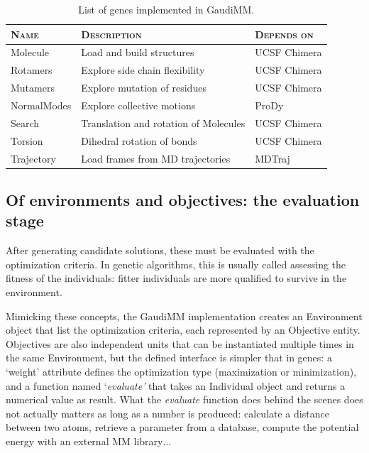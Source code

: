 \begin{table}[hbtp]
	\caption[List of genes implemented in GaudiMM]{List of genes implemented in GaudiMM.}
	\label{table:gaudi-genes}
\footnotesize
{}%
%
%
\begin{tabularx}{\textwidth}{LMR}
\toprule
\textsc{Name} & \textsc{Description} & \textsc{Depends on} \\
\toprule
 Molecule & Load and build structures & UCSF Chimera \\
\hhline{~~~}
 Rotamers & Explore side chain flexibility & UCSF Chimera \\
\hhline{~~~}
 Mutamers & Explore mutation of residues & UCSF Chimera \\
\hhline{~~~}
 NormalModes & Explore collective motions & ProDy \\
\hhline{~~~}
 Search & Translation and rotation of Molecules & UCSF Chimera \\
\hhline{~~~}
 Torsion & Dihedral rotation of bonds & UCSF Chimera \\
\hhline{~~~}
 Trajectory & Load frames from MD trajectories & MDTraj \\
\bottomrule
\end{tabularx}
\end{table}





\subsection{Of environments and objectives: the evaluation stage}
After generating candidate solutions, these must be evaluated with the optimization criteria. In genetic algorithms, this is usually called assessing the fitness of the individuals: fitter individuals are more qualified to survive in the environment.

Mimicking these concepts, the GaudiMM implementation creates an Environment object that list the optimization criteria, each represented by an Objective entity. Objectives are also independent units that can be instantiated multiple times in the same Environment, but the defined interface is simpler that in genes: a ‘weight’ attribute defines the optimization type (maximization or minimization), and a function named ‘\textit{evaluate’} that takes an Individual object and returns a numerical value as result. What the \textit{evaluate} function does behind the scenes does not actually matters as long as a number is produced: calculate a distance between two atoms, retrieve a parameter from a database, compute the potential energy with an external MM library$ \ldots $

